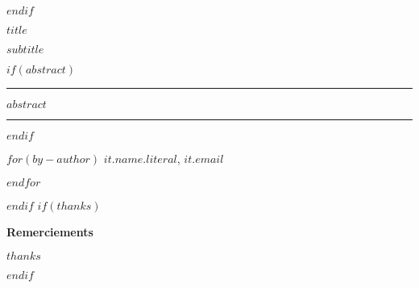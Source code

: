 \begin{titlepage}
$endif$
\newpage
\pagestyle{empty}
\newpage
\pagestyle{empty}
 
\LARGE\textbf{$title$}

\large\textbf{$subtitle$}

\vspace{1cm}

$if(abstract)$

\par\rule{\textwidth}{0.5pt}

$abstract$

\par\rule{\textwidth}{0.5pt}

$endif$

\vspace{1cm}

\begin{flushright}
$for(by-author)$
   \linespread{1}\small{\textbf{$it.name.literal$}}, {\small{$it.email$}}\par
$endfor$ %
\end{flushright}
$endif$
$if(thanks)$
\vspace{2.5cm}
\begin{minipage}[b]{40em}
  \textcolor{scporouge}{
    \textbf{Remerciements}}{

      \vspace{0.2cm}
      \vspace{0.2cm}
    
    \textit{\small{$thanks$}} 
  }
\end{minipage}
$endif$
\end{titlepage}